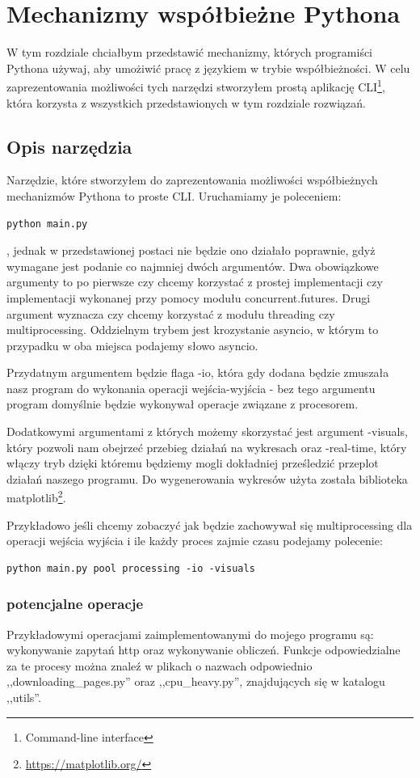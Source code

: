 \chapter{Mechanizmy współbieżne Pythona}
W tym rozdziale chciałbym przedstawić mechanizmy, których programiści Pythona używaj, aby umożiwić pracę z językiem w trybie współbieżności. W celu zaprezentowania możliwości tych narzędzi stworzyłem prostą aplikację CLI\footnote{Command-line interface}, która korzysta z wszystkich przedstawionych w tym rozdziale rozwiązań.

\section{Opis narzędzia}
Narzędzie, które stworzyłem do zaprezentowania możliwości współbieżnych mechanizmów Pythona to proste CLI. Uruchamiamy je poleceniem:
\begin{lstlisting}
python main.py
\end{lstlisting}
, jednak w przedstawionej postaci nie będzie ono działało poprawnie, gdyż wymagane jest podanie co najmniej dwóch argumentów. Dwa obowiązkowe argumenty to po pierwsze czy chcemy korzystać z prostej implementacji czy implementacji wykonanej przy pomocy modułu concurrent.futures. Drugi argument wyznacza czy chcemy korzystać z modułu threading czy multiprocessing. Oddzielnym trybem jest krozystanie asyncio, w którym to przypadku w oba miejsca podajemy słowo asyncio.

Przydatnym argumentem będzie flaga -io, która gdy dodana będzie zmuszała nasz program do wykonania operacji wejścia-wyjścia - bez tego argumentu program domyślnie będzie wykonywał operacje związane z procesorem.

Dodatkowymi argumentami z których możemy skorzystać jest argument -visuals, który pozwoli nam obejrzeć przebieg działań na wykresach oraz -real-time, który włączy tryb dzięki któremu będziemy mogli dokładniej prześledzić przeplot działań naszego programu. Do wygenerowania wykresów użyta została biblioteka matplotlib\footnote{\url{https://matplotlib.org/}}.

Przykładowo jeśli chcemy zobaczyć jak będzie zachowywał się multiprocessing dla operacji wejścia wyjścia i ile każdy proces zajmie czasu podejamy polecenie:
\begin{lstlisting}
python main.py pool processing -io -visuals
\end{lstlisting}

\subsection{potencjalne operacje}
Przykładowymi operacjami zaimplementowanymi do mojego programu są: wykonywanie zapytań http oraz wykonywanie obliczeń. Funkcje odpowiedzialne za te procesy można znaleź w plikach o nazwach odpowiednio ,,downloading\_pages.py'' oraz ,,cpu\_heavy.py'', znajdujących się w katalogu ,,utils''.

